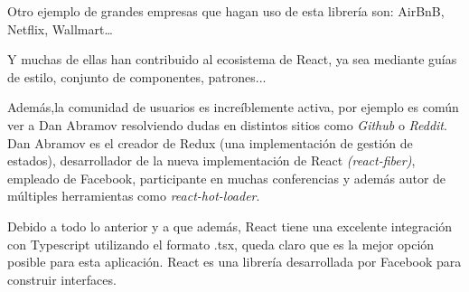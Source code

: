 \bigskip
Otro ejemplo de grandes empresas que hagan uso de esta librería son: AirBnB, Netflix, Wallmart…  \cite{ReactUsers}

\bigskip
Y muchas de ellas han contribuido al ecosistema de React, ya sea mediante guías de estilo, conjunto de componentes, patrones... \cite{ReactStyleGuide}

\bigskip
Además,la comunidad de usuarios es increíblemente activa, por ejemplo es común ver a Dan Abramov resolviendo dudas
en distintos sitios como \textit{Github} o \textit{Reddit}. Dan Abramov es el creador de Redux (una implementación de gestión de estados), desarrollador de la nueva implementación de 
React \textit{(react-fiber)}, empleado de Facebook, participante en muchas conferencias y además autor de 
múltiples herramientas como \textit{react-hot-loader}. 

\bigskip
Debido a todo lo anterior y a que además, React tiene una excelente integración con Typescript utilizando 
el formato .tsx, queda claro que es la mejor opción posible para esta aplicación. React es una librería 
desarrollada por Facebook para construir interfaces.
